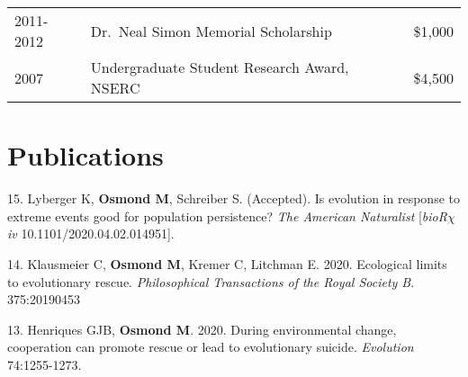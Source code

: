 \documentclass[12pt]{article}
\begin{document}
\begin{tabular}{llr}
  2011-2012 & Dr.\ Neal Simon Memorial Scholarship & \$1,000\\
  2007 & Undergraduate Student Research Award, NSERC & \$4,500\\
\end{tabular}

\newpage
\section*{Publications}

\noindent\hspace{.1cm}15. Lyberger K, \textbf{Osmond M}, Schreiber S. (Accepted). Is evolution in response to extreme events good for population persistence? \textit{The American Naturalist} [\textit{bioR$\chi$iv} 10.1101/2020.04.02.014951].

\noindent\hspace{.1cm}14. Klausmeier C, \textbf{Osmond M}, Kremer C, Litchman E. 2020. Ecological limits to evolutionary rescue. \textit{Philosophical Transactions of the Royal Society B}. 375:20190453

\noindent\hspace{.1cm}13. Henriques GJB, \textbf{Osmond M}. 2020. During environmental change, cooperation can promote rescue or lead to evolutionary suicide. \textit{Evolution} 74:1255-1273.
\end{document}
